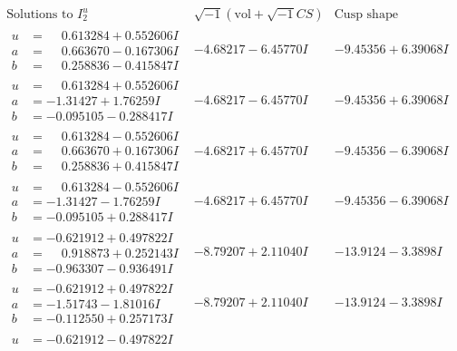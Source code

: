 \documentclass[1p]{elsarticle_modified}
\theoremstyle{definition}
\newcommand{\I}{\sqrt{-1}}
\begin{document}
$$\begin{array}{c|c|c}  
\text{Solutions to }I^u_{2}& \I (\text{vol} + \sqrt{-1}CS) & \text{Cusp shape}\\
 \hline 
\begin{aligned}
u &= \phantom{-}0.613284 + 0.552606 I \\
a &= \phantom{-}0.663670 - 0.167306 I \\
b &= \phantom{-}0.258836 - 0.415847 I\end{aligned}
 & -4.68217 - 6.45770 I & -9.45356 + 6.39068 I \\ \hline\begin{aligned}
u &= \phantom{-}0.613284 + 0.552606 I \\
a &= -1.31427 + 1.76259 I \\
b &= -0.095105 - 0.288417 I\end{aligned}
 & -4.68217 - 6.45770 I & -9.45356 + 6.39068 I \\ \hline\begin{aligned}
u &= \phantom{-}0.613284 - 0.552606 I \\
a &= \phantom{-}0.663670 + 0.167306 I \\
b &= \phantom{-}0.258836 + 0.415847 I\end{aligned}
 & -4.68217 + 6.45770 I & -9.45356 - 6.39068 I \\ \hline\begin{aligned}
u &= \phantom{-}0.613284 - 0.552606 I \\
a &= -1.31427 - 1.76259 I \\
b &= -0.095105 + 0.288417 I\end{aligned}
 & -4.68217 + 6.45770 I & -9.45356 - 6.39068 I \\ \hline\begin{aligned}
u &= -0.621912 + 0.497822 I \\
a &= \phantom{-}0.918873 + 0.252143 I \\
b &= -0.963307 - 0.936491 I\end{aligned}
 & -8.79207 + 2.11040 I & -13.9124 - 3.3898 I \\ \hline\begin{aligned}
u &= -0.621912 + 0.497822 I \\
a &= -1.51743 - 1.81016 I \\
b &= -0.112550 + 0.257173 I\end{aligned}
 & -8.79207 + 2.11040 I & -13.9124 - 3.3898 I \\ \hline\begin{aligned}
u &= -0.621912 - 0.497822 I \\

\end{aligned}
\end{array}$$
\end{document}
